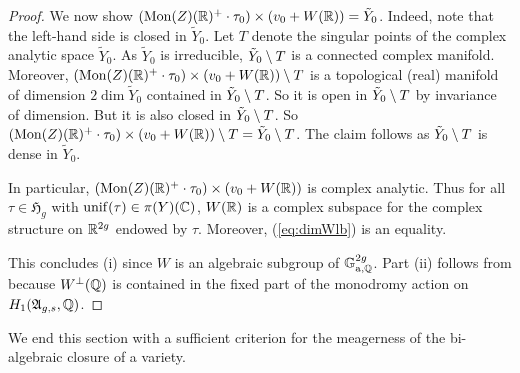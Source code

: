 \documentclass[12pt,oneside]{amsart}
\newcommand{\philipp}[1]{{\color{blue} Philipp: #1}}
\begin{document}
\begin{proof}
  We now show
  $(\mathrm{Mon}(Z)({\mathbb{R}})^+\cdot\tau_0)\times (v_0+W({\mathbb{R}}))=\tilde Y_0$.
  Indeed, note that the left-hand side is closed in
  $\tilde Y_0$. 
  Let $T$ denote the singular points of the complex analytic
  space
  $\tilde Y_0$.
  As $\tilde Y_0$ is irreducible, 
 $\tilde Y_0 \setminus T$ is a connected complex manifold.
 Moreover, $(\mathrm{Mon}(Z)({\mathbb{R}})^+\cdot\tau_0)\times (v_0+W({\mathbb{R}}))\setminus
  T$ is a topological (real) manifold of dimension ${2\dim \tilde Y_0}$ contained
  in $\tilde Y_0\setminus T$. So it is open
  in $\tilde Y_0\setminus T$ by invariance of dimension. But it is also closed in $\tilde Y_0\setminus T$.
  So
  $(\mathrm{Mon}(Z)({\mathbb{R}})^+\cdot\tau_0)\times (v_0+W({\mathbb{R}}))\setminus T=\tilde
  Y_0\setminus T$. The claim follows as $\tilde Y_0\setminus T$ is dense in
  $\tilde Y_0$.

  In particular, $(\mathrm{Mon}(Z)({\mathbb{R}})^+\cdot\tau_0)\times
  (v_0+W({\mathbb{R}}))$ is complex analytic. Thus for all $\tau \in
  \mathfrak{H}_g$ with $\mathrm{unif}(\tau) \in \pi(Y)({\mathbb{C}})$, $W({\mathbb{R}})$
  is a complex subspace for the complex structure on ${\mathbb{R}}^{2g}$ endowed
  by $\tau$. Moreover, (\ref{eq:dimWlb}) is an equality.
  
  This concludes (i) since $W$ is an algebraic subgroup of
  ${\mathbb{G}}_{\mathrm{a},{\mathbb{Q}}}^{2g}$. Part (ii) follows from
  \cite[Corollaire~4.1.2]{Deligne:Hodge2} because
  $W^{\perp}({\mathbb{Q}})$ is contained in the fixed part of the monodromy
  action on $H_1(\mathfrak{A}_{g,s},{\mathbb{Q}})$.
\end{proof}



We end this section with a sufficient criterion for the meagerness of the bi-algebraic
closure of a variety.
\end{document}
